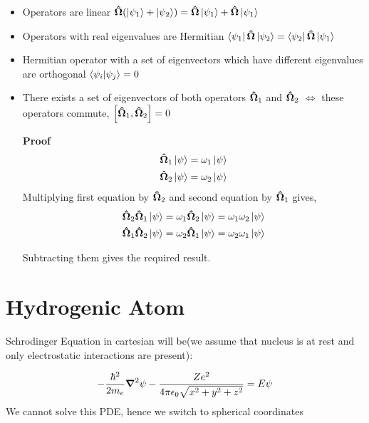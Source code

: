 \documentclass[11pt]{article}
\theoremstyle{definition}
\begin{document}
\begin{itemize}
    \item Operators are linear $\vectorunit{\Omega} (\ket{\psi_1} + \ket{\psi_2}) =\vectorunit{\Omega}  \ket{\psi_1} + \vectorunit{\Omega}\ket{\psi_1} $
    \item Operators with real eigenvalues are Hermitian $\bra{\psi_1}\vectorunit{\Omega}\ket{\psi_2} = \bra{\psi_2}\vectorunit{\Omega}\ket{\psi_1}$
    \item Hermitian operator with a set of eigenvectors which have different eigenvalues are orthogonal $\bra{\psi_i}\ket{\psi_j} = 0$
    \item There exists a set of eigenvectors of both operators $\vectorunit{\Omega}_1$ and $\vectorunit{\Omega}_2$ $\iff$ these operators commute, $\comm{\vectorunit{\Omega}_1}{\vectorunit{\Omega}_2} = 0$
    \begin{shaded}
    \textbf{Proof}
    \begin{gather*}
        \vectorunit{\Omega}_1 \ket{\psi} = \omega_1 \ket{\psi}\\
        \vectorunit{\Omega}_2 \ket{\psi} = \omega_2 \ket{\psi}
    \end{gather*}
    Multiplying first equation by $\vectorunit{\Omega}_2$ and second equation by $\vectorunit{\Omega}_1$ gives,
    \begin{gather*}
        \vectorunit{\Omega}_2 \vectorunit{\Omega}_1 \ket{\psi} = \omega_1 \vectorunit{\Omega}_2 \ket{\psi} = \omega_1 \omega_2 \ket{\psi}\\
        \vectorunit{\Omega}_1 \vectorunit{\Omega}_2 \ket{\psi} = \omega_2 \vectorunit{\Omega}_1 \ket{\psi} = \omega_2 \omega_1 \ket{\psi}\\
    \end{gather*}
    
    Subtracting them gives the required result.
    \end{shaded}
\end{itemize}

\section{Hydrogenic Atom}
Schrodinger Equation in cartesian will be(we assume that nucleus is at rest and only electrostatic interactions are present):

\begin{equation*}
    -\frac{\hbar^2}{2m_e} \grad^2 \psi -\frac{Ze^2}{4\pi \epsilon_0 \sqrt{x^2 + y^2 + z^2}} = E\psi 
\end{equation*}
We cannot solve this PDE, hence we switch to spherical coordinates
\end{document}
